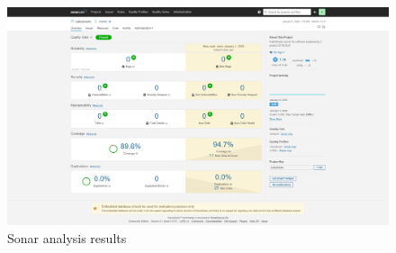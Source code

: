 \bigskip
\begin{figure}[H]
	\centering
	\includegraphics[width=1\linewidth]{Images/sonarReport}
	\caption{Sonar analysis results}
	\label{fig:sonarreport}
\end{figure}
